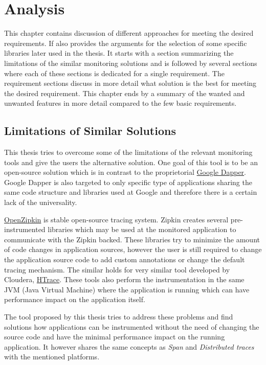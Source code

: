 \chapter{Analysis}
\label{analysis}
This chapter contains discussion of different approaches for meeting the desired requirements. If also provides the arguments for the selection of some specific libraries later used in the thesis. It starts with a section summarizing the limitations of the similar monitoring solutions and is followed by several sections where each of these sections is dedicated for a single requirement. The requirement sections discuss in more detail what solution is the best for meeting the desired requirement. This chapter ends by a summary of the wanted and unwanted features in more detail compared to the few basic requirements.

\section{Limitations of Similar Solutions}
This thesis tries to overcome some of the limitations of the relevant monitoring tools and give the users the alternative solution. One goal of this tool is to be an open-source solution which is in contrast to the proprietorial \hyperref[dapper]{Google Dapper}. Google Dapper is also targeted to only specific type of applications sharing the same code structure and libraries used at Google and therefore there is a certain lack of the universality. 

\hyperref[zipkin]{OpenZipkin} is stable open-source tracing system. Zipkin creates several pre-instrumented libraries which may be used at the monitored application to communicate with the Zipkin backed. These libraries try to minimize the amount of code changes in application sources, however the user is still required to change the application source code to add custom annotations or change the default tracing mechanism. The similar holds for very similar tool developed by Cloudera, \hyperref[htrace]{HTrace}. These tools also perform the instrumentation in the same JVM (Java Virtual Machine) where the application is running which can have performance impact on the application itself.

The tool proposed by this thesis tries to address these problems and find solutions how applications can be instrumented without the need of changing the source code and have the minimal performance impact on the running application. It however shares the same concepts as \textit{Span} and\textit{ Distributed traces} with the mentioned platforms.
